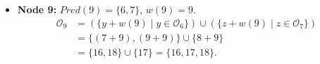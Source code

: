 \begin{example}
\begin{itemize}
        \item \textbf{Node 9:} $Pred(9)=\{6, 7\}$, $w(9)=9$.
              \begin{align*}
                  \mathcal{O}_9 & = \left( \{ y + w(9) \mid y \in \mathcal{O}_6 \} \right) \cup \left( \{ z + w(9) \mid z \in \mathcal{O}_7 \} \right) \\
                                & = \{ (7+9), (9+9) \} \cup \{ 8 + 9 \}                                                                                \\
                                & = \{16, 18\} \cup \{17\} = \{16, 17, 18\}.
              \end{align*}




\end{itemize}
\end{example}
